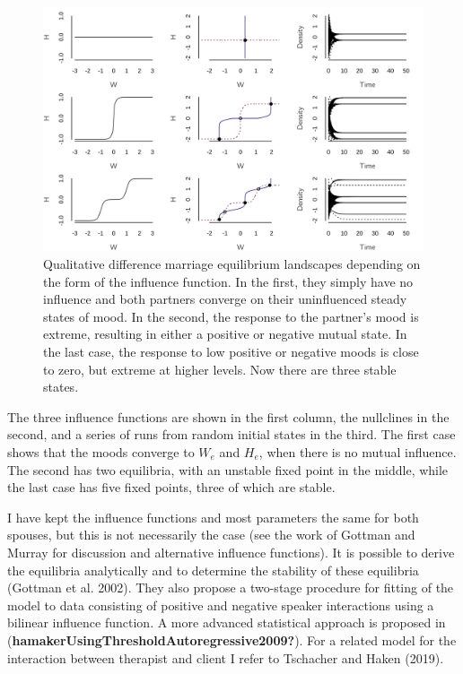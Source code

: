\documentclass[
  a4paper,
  DIV=11,
  numbers=noendperiod]{scrreprt}
\begin{document}
\begin{figure}

{\centering \includegraphics{media/ch4n/fig-ch4n-img10-old-58.png}

}

\caption{\label{fig-ch4n-img10-old-58}Qualitative difference marriage
equilibrium landscapes depending on the form of the influence function.
In the first, they simply have no influence and both partners converge
on their uninfluenced steady states of mood. In the second, the response
to the partner's mood is extreme, resulting in either a positive or
negative mutual state. In the last case, the response to low positive or
negative moods is close to zero, but extreme at higher levels. Now there
are three stable states.}

\end{figure}

The three influence functions are shown in the first column, the
nullclines in the second, and a series of runs from random initial
states in the third. The first case shows that the moods converge to
\(W_{e}\) and \(H_{e}\), when there is no mutual influence. The second
has two equilibria, with an unstable fixed point in the middle, while
the last case has five fixed points, three of which are stable.

I have kept the influence functions and most parameters the same for
both spouses, but this is not necessarily the case (see the work of
Gottman and Murray for discussion and alternative influence functions).
It is possible to derive the equilibria analytically and to determine
the stability of these equilibria (Gottman et al. 2002). They also
propose a two-stage procedure for fitting of the model to data
consisting of positive and negative speaker interactions using a
bilinear influence function. A more advanced statistical approach is
proposed in (\textbf{hamakerUsingThresholdAutoregressive2009?}). For a
related model for the interaction between therapist and client I refer
to Tschacher and Haken (2019).
\end{document}

